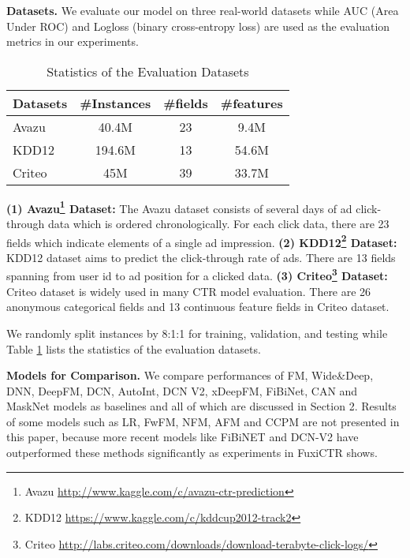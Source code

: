 \documentclass[sigconf,authorversion]{acmart}
\begin{document}
\textbf{Datasets.}
We evaluate our model on three real-world datasets while AUC (Area Under ROC) and Logloss (binary cross-entropy loss) are used as the evaluation metrics in our experiments.

\begin{table}[h]
\centering
\caption{Statistics of the Evaluation Datasets}
\begin{tabular}{lccc}
\toprule
Datasets  & \#Instances & \#fields & \#features \\
\midrule
Avazu       & 40.4M  & 23 & 9.4M     \\
KDD12     & 194.6M  & 13 & 54.6M \\
Criteo       & 45M  & 39 & 33.7M     \\
\bottomrule
\end{tabular}
\label{tab:datasets}
\end{table}

\textbf{(1) Avazu\footnote{Avazu \url{http://www.kaggle.com/c/avazu-ctr-prediction}} Dataset:} The Avazu dataset consists of several days of ad click- through data which is ordered chronologically. For each click data, there are 23 fields which indicate elements of a single ad impression.
\textbf{(2) KDD12\footnote{KDD12 \url{https://www.kaggle.com/c/kddcup2012-track2}} Dataset:} KDD12 dataset aims to predict the click-through rate of ads. There are 13 fields spanning from user id to ad position for a clicked data.
\textbf{(3) Criteo\footnote{Criteo \url{http://labs.criteo.com/downloads/download-terabyte-click-logs/}} Dataset:} Criteo dataset is widely used in many CTR model evaluation. There are 26 anonymous categorical fields and 13 continuous feature fields in Criteo dataset.

We randomly split instances by 8:1:1 for training, validation, and testing while Table \ref{tab:datasets} lists the statistics of the evaluation datasets. 

\textbf{Models for Comparison.}
We compare performances of FM\cite{rendle2010factorization}, Wide\&Deep\cite{cheng2016wide}, DNN\cite{zhang2016deep}, DeepFM\cite{guo2017deepfm}, DCN\cite{wang2017deep}, AutoInt\cite{song2019autoint}, DCN V2\cite{WangSCJLHC21}, xDeepFM\cite{lian2018xdeepfm}, FiBiNet\cite{HuangZZ19}, CAN\cite{zhou2020can}
and MaskNet\cite{masknet} models as baselines and all of which are discussed in Section 2. Results of some models such as LR\cite{he2014practical}, FwFM\cite{pan2018field}, NFM\cite{nfm}, AFM\cite{xiao2017attentional} and CCPM\cite{ccpm} are not presented in this paper, because more recent models like FiBiNET\cite{HuangZZ19} and DCN-V2\cite{WangSCJLHC21} have  outperformed these methods significantly as experiments in FuxiCTR\cite{jieming-2009-05794} shows.
\end{document}
